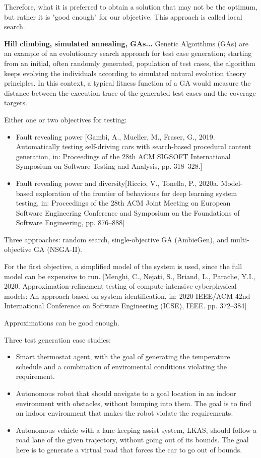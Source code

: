 Therefore, what it is preferred to obtain a solution that may not be the optimum, but rather it is "good enough" for our objective. This approach is called local search.

 
\textbf{Hill climbing, simulated annealing, GAs...}
Genetic Algorithms (GAs) are an example of an
evolutionary search approach for test case generation; starting from an initial, often randomly generated, population of 
test cases, the algorithm keeps evolving the individuals according to simulated natural evolution theory principles.
In this context, a typical fitness function of a GA would measure the distance between the execution trace of the generated test cases
and the coverage targets.


Either one or two objectives for testing:
\begin{itemize}
    \item Fault revealing power
        [Gambi, A., Mueller, M., Fraser, G., 2019. Automatically testing
        self-driving cars with search-based procedural content generation, in:
        Proceedings of the 28th ACM SIGSOFT International Symposium on
        Software Testing and Analysis, pp. 318–328.]

    \item Fault revealing power and diversity[Riccio, V., Tonella, P., 2020a. Model-based exploration of the frontier
    of behaviours for deep learning system testing, in: Proceedings of the
    28th ACM Joint Meeting on European Software Engineering Conference and Symposium on the Foundations of Software Engineering,
    pp. 876–888]
\end{itemize}

 Three approaches: random search, single-objective GA (AmbieGen), and multi-objective GA (NSGA-II).

For the first objective, a simplified  model of the system is used, since the full model can be expensive to run.
 [Menghi, C., Nejati, S., Briand, L., Parache, Y.I., 2020.
 Approximation-refinement testing of compute-intensive cyberphysical models: An approach based on system identification,
 in: 2020 IEEE/ACM 42nd International Conference on Software
 Engineering (ICSE), IEEE. pp. 372–384]

Approximations can be good enough.

Three test generation case studies:
\begin{itemize}
    \item Smart thermostat agent, with the goal of generating the temperature schedule and a combination of enviromental conditions violating the requirement.
    \item Autonomous robot that should navigate to a goal location in an indoor environment with obstacles, without bumping into them. The goal is to find an indoor environment that makes the robot violate the requirements.
    \item Autonomous vehicle with a lane-keeping assist system, LKAS, should follow a road lane of the given trajectory, without going out of its bounds. The goal here is to generate a virtual road that forces the car to go out of bounds.
\end{itemize}


